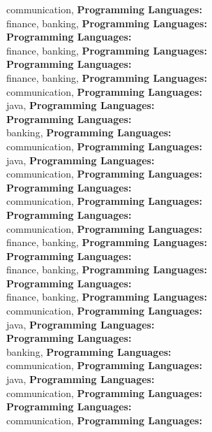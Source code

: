 communication, \textbf{Programming Languages:} \\
finance, banking, \textbf{Programming Languages:} \\
\textbf{Programming Languages:} \\
finance, banking, \textbf{Programming Languages:} \\
\textbf{Programming Languages:} \\
finance, banking, \textbf{Programming Languages:} \\
communication, \textbf{Programming Languages:} \\
java, \textbf{Programming Languages:} \\
\textbf{Programming Languages:} \\
banking, \textbf{Programming Languages:} \\
communication, \textbf{Programming Languages:} \\
java, \textbf{Programming Languages:} \\
communication, \textbf{Programming Languages:} \\
\textbf{Programming Languages:} \\
communication, \textbf{Programming Languages:} \\
\textbf{Programming Languages:} \\
communication, \textbf{Programming Languages:} \\
finance, banking, \textbf{Programming Languages:} \\
\textbf{Programming Languages:} \\
finance, banking, \textbf{Programming Languages:} \\
\textbf{Programming Languages:} \\
finance, banking, \textbf{Programming Languages:} \\
communication, \textbf{Programming Languages:} \\
java, \textbf{Programming Languages:} \\
\textbf{Programming Languages:} \\
banking, \textbf{Programming Languages:} \\
communication, \textbf{Programming Languages:} \\
java, \textbf{Programming Languages:} \\
communication, \textbf{Programming Languages:} \\
\textbf{Programming Languages:} \\
communication, \textbf{Programming Languages:} \\
